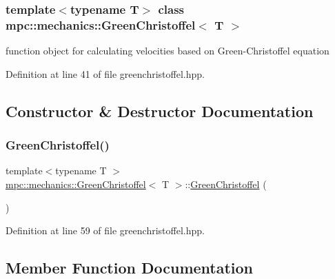 \subsubsection*{template$<$typename T$>$\newline
class mpc\+::mechanics\+::\+Green\+Christoffel$<$ T $>$}

function object for calculating velocities based on Green-\/\+Christoffel equation 

Definition at line 41 of file greenchristoffel.\+hpp.



\subsection{Constructor \& Destructor Documentation}
\mbox{\label{structmpc_1_1mechanics_1_1_green_christoffel_a7a0ced87a84adeda26f1c3e70d6f9214}} 
\subsubsection{\texorpdfstring{Green\+Christoffel()}{GreenChristoffel()}}
{\footnotesize\ttfamily template$<$typename T $>$ \\
\mbox{\hyperlink{structmpc_1_1mechanics_1_1_green_christoffel}{mpc\+::mechanics\+::\+Green\+Christoffel}}$<$ T $>$\+::\mbox{\hyperlink{structmpc_1_1mechanics_1_1_green_christoffel}{Green\+Christoffel}} (\begin{DoxyParamCaption}{ }\end{DoxyParamCaption})\hspace{0.3cm}{\ttfamily [inline]}}



Definition at line 59 of file greenchristoffel.\+hpp.



\subsection{Member Function Documentation}
\mbox{\label{structmpc_1_1mechanics_1_1_green_christoffel_a84df39c5961390293bf77ba4dfadac13}} 
